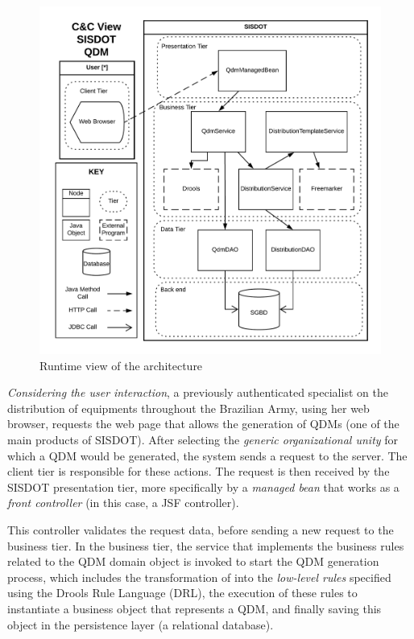 \begin{figure}[!ht] \centering
\includegraphics[scale=0.55]{img/runtimeView_qdm.png}
\caption{Runtime view of the architecture} 
\label{fig:fig:runtime_qdm}
\end{figure}

\emph{Considering the user interaction}, a previously authenticated specialist on the 
distribution of equipments throughout the Brazilian Army, using her web browser, 
requests the web page that allows the generation of QDMs (one of the main products of SISDOT). 
After selecting the \emph{generic organizational unity} for which a QDM would be 
generated, the system sends a request to the server. The client tier is responsible for these actions. 
The request is then received by the SISDOT presentation tier, more specifically by a \emph{managed bean} that works 
as a \emph{front controller} (in this case, a JSF controller). 

This controller validates  
the request data, before sending a new request to the business tier. In the business tier, the service 
that implements the business rules related to the QDM domain object is invoked to start the QDM generation process, 
which includes the transformation of \callers into the \emph{low-level rules} specified using the Drools Rule Language (DRL), 
the execution of these rules to instantiate a business object that represents a QDM, and finally saving this 
object in the persistence layer (a relational database). 

